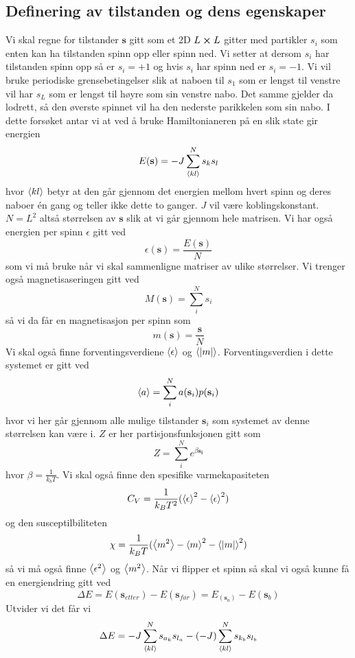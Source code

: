 \documentclass[reprint,english,notitlepage]{revtex4-2}  %
\begin{document}
\subsection{Definering av tilstanden og dens egenskaper}
Vi skal regne for tilstander $\mathbf{s}$ gitt som et 2D $L\cross L$ gitter med partikler $s_i$ som enten kan ha tilstanden spinn opp eller spinn ned. Vi setter at dersom $s_i$ har tilstanden spinn opp så er $s_i=+1$ og hvis $s_i$ har spinn ned er $s_i=-1$. Vi vil bruke periodiske grensebetingelser slik at naboen til $s_1$ som er lengst til venstre vil har $s_L$ som er lengst til høyre som sin venstre nabo. Det samme gjelder da lodrett, så den øverste spinnet vil ha den nederste parikkelen som sin nabo. I dette forsøket antar vi at ved å bruke Hamiltonianeren på en slik state gir energien
$$
E(\mathbf{s})=-J\sum_{\expval{kl}}^{N} s_k s_l
$$
hvor $\expval{kl}$ betyr at den går gjennom det energien mellom hvert spinn og deres naboer én gang og teller ikke dette to ganger. $J$ vil være koblingskonstant. $N=L^2$ altså størrelsen av $\mathbf{s}$ slik at vi går gjennom hele matrisen.
\newline Vi har også energien per spinn $\epsilon$ gitt ved 
$$
\epsilon(\mathbf{s}) =\frac{E(\mathbf{s})}{N}
$$
som vi må bruke når vi skal sammenligne matriser av ulike størrelser.
\newline Vi trenger også magnetisaseringen gitt ved
$$
M(\mathbf{s})=\sum_i^N s_i
$$
så vi da får en magnetisasjon per spinn som
$$
m(\mathbf{s})=\frac{\mathbf{s}}{N}
$$
Vi skal også finne forventingsverdiene $\expval{\epsilon}$ og $\expval{|m|}$. Forventingsverdien i dette systemet er gitt ved
$$
\expval{a}=\sum _i^{N}a(\mathbf{s}_i) p(\mathbf{s}_i)
$$
hvor vi her går gjennom alle mulige tilstander $\mathbf{s}_i$ som systemet av denne størrelsen kan være i. $Z$ er her partisjonsfunksjonen gitt som
$$
Z=\sum_{i}^{N}e^{\beta \mathbf{s_i}}
$$
hvor $\beta=\frac{1}{k_bT}$. \newline  Vi skal også finne den spesifike varmekapasiteten
$$
C_V=\frac{1}{k_B T^2}(\expval{\epsilon}^2-\expval{\epsilon}^2)
$$
og den susceptilbiliteten
$$
\chi =\frac{1}{k_B T}(\expval{m^2}-\expval{m}^2-\expval{|m|}^2)
$$
så vi må også finne $\expval{\epsilon^2}$ og $\expval{m^2}$. \newline
Når vi flipper et spinn så skal vi også kunne få en energiendring gitt ved
$$
\Delta E=E(\mathbf{s}_{etter})-E(\mathbf{s}_{før})=E_(\mathbf{s}_a)-E(\mathbf{s}_b)
$$
Utvider vi det får vi
$$
\Delta E=-J\sum_{\expval{kl}}^{N} s_{a_k} s_{l_a}-(-J)\sum_{\expval{kl}}^{N} s_{k_b} s_{l_b}
$$
\end{document}

